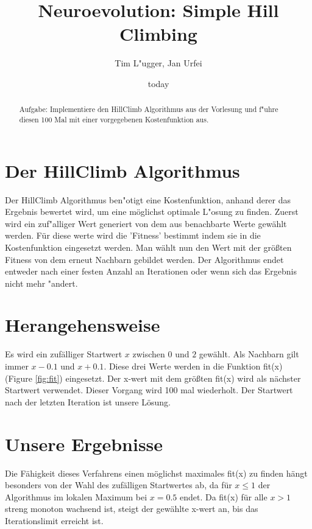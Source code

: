 \documentclass{hbrs-ecta-report}
\begin{document}

\title{Neuroevolution: Simple Hill Climbing}
\subtitle{}

\author{
\alignauthor
Tim L"ugger, Jan Urfei
}

\date{today}
\maketitle
\begin{abstract}
Aufgabe: Implementiere den HillClimb Algorithmus aus der Vorlesung und f"uhre diesen 100 Mal mit einer vorgegebenen Kostenfunktion aus.
\end{abstract}

\section{Der HillClimb Algorithmus}
Der HillClimb Algorithmus ben"otigt eine Kostenfunktion, anhand derer das Ergebnis bewertet wird, um eine möglichst optimale L"osung zu finden. Zuerst wird ein zuf"alliger Wert generiert von dem aus benachbarte Werte gewählt werden. Für diese werte wird die 'Fitness' bestimmt indem sie in die Kostenfunktion eingesetzt werden. Man wählt nun den Wert mit der größten Fitness von dem erneut Nachbarn gebildet werden. Der Algorithmus endet entweder nach einer festen Anzahl an Iterationen oder wenn sich das Ergebnis nicht mehr "andert.

\section{Herangehensweise}

Es wird ein zufälliger Startwert $x$ zwischen $0$ und $2$ gewählt. Als Nachbarn gilt immer $x - 0.1$ und $x + 0.1$. Diese drei Werte werden in die Funktion fit(x) (Figure \ref{fig:fit}) eingesetzt. Der x-wert mit dem größten fit(x) wird als nächster Startwert verwendet. Dieser Vorgang wird 100 mal wiederholt. Der Startwert nach der letzten Iteration ist unsere Lösung. 

\section{Unsere Ergebnisse}
Die Fähigkeit dieses Verfahrens einen möglichst maximales fit(x) zu finden hängt besonders von der Wahl des zufälligen Startwertes ab, da für $x\leq1$ der Algorithmus im lokalen Maximum bei $x=0.5$ endet. Da fit(x) für alle $x>1$ streng monoton wachsend ist, steigt der gewählte x-wert 
an, bis das Iterationslimit erreicht ist.
\end{document}
